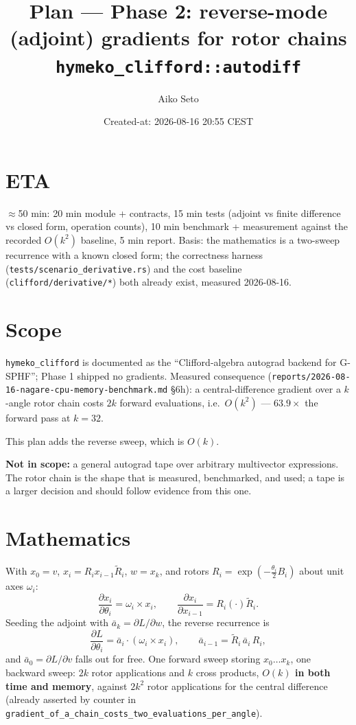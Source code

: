 \documentclass[11pt,a4paper]{article}
\title{\textbf{Plan --- Phase 2: reverse-mode (adjoint) gradients for rotor chains}\\
       \texttt{hymeko\_clifford::autodiff}}
\author{Aiko Seto}
\date{Created-at: 2026-08-16 20:55 CEST}
\begin{document}
\maketitle

\section*{ETA}
$\approx$50 min: 20 min module + contracts, 15 min tests (adjoint vs finite
difference vs closed form, operation counts), 10 min benchmark + measurement
against the recorded $O(k^2)$ baseline, 5 min report. Basis: the mathematics is a
two-sweep recurrence with a known closed form; the correctness harness
(\texttt{tests/scenario\_derivative.rs}) and the cost baseline
(\texttt{clifford/derivative/*}) both already exist, measured 2026-08-16.

\section{Scope}
\texttt{hymeko\_clifford} is documented as the ``Clifford-algebra autograd
backend for G-SPHF''; Phase 1 shipped no gradients. Measured consequence
(\texttt{reports/2026-08-16-nagare-cpu-memory-benchmark.md} \S6h): a
central-difference gradient over a $k$-angle rotor chain costs $2k$ forward
evaluations, i.e.\ $O(k^2)$ --- $63.9\times$ the forward pass at $k=32$.

This plan adds the reverse sweep, which is $O(k)$.

\textbf{Not in scope:} a general autograd tape over arbitrary multivector
expressions. The rotor chain is the shape that is measured, benchmarked, and
used; a tape is a larger decision and should follow evidence from this one.

\section{Mathematics}
With $x_0 = v$, $x_i = R_i x_{i-1} \tilde R_i$, $w = x_k$, and rotors
$R_i = \exp(-\tfrac{\theta_i}{2} B_i)$ about unit axes $\omega_i$:
\[
  \frac{\partial x_i}{\partial \theta_i} = \omega_i \times x_i,
  \qquad
  \frac{\partial x_i}{\partial x_{i-1}} = R_i(\cdot)\tilde R_i .
\]
Seeding the adjoint with $\bar a_k = \partial L/\partial w$, the reverse
recurrence is
\[
  \frac{\partial L}{\partial \theta_i} = \bar a_i \cdot (\omega_i \times x_i),
  \qquad
  \bar a_{i-1} = \tilde R_i\, \bar a_i\, R_i ,
\]
and $\bar a_0 = \partial L/\partial v$ falls out for free. One forward sweep
storing $x_0 \dots x_k$, one backward sweep: $2k$ rotor applications and $k$ cross
products, \textbf{$O(k)$ in both time and memory}, against $2k^2$ rotor
applications for the central difference (already asserted by counter in
\texttt{gradient\_of\_a\_chain\_costs\_two\_evaluations\_per\_angle}).
\end{document}
